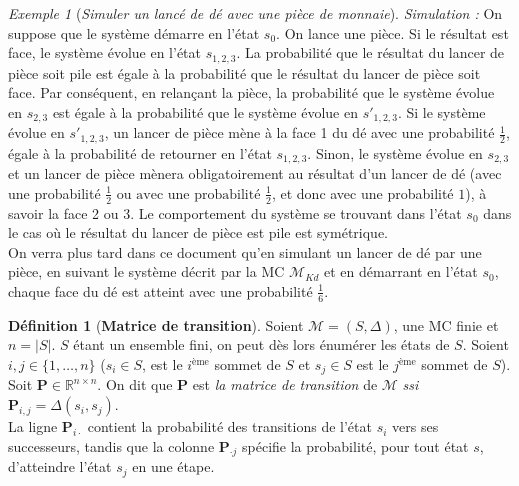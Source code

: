 \documentclass[12pt,a4paper]{report}
\theoremstyle{definition}%
\newtheorem{definition}{Définition}[chapter]
\theoremstyle{remark}
\newtheorem{example}{Exemple}[chapter]
\newcommand{\ssi}{\textit{ssi} }
\begin{document}
\begin{example} [\textit{Simuler un lancé de dé avec une pièce de monnaie}]
	\textit{Simulation : }On suppose que le système démarre en l'état $s_0$. On lance une pièce. Si le résultat est face, le système évolue en l'état $s_{1, 2, 3}$. La probabilité que le résultat du lancer de pièce soit pile est égale à la probabilité que le résultat du lancer de pièce soit face. Par conséquent, en relançant la pièce, la probabilité que le système évolue en $s_{2, 3}$ est égale à la probabilité que le système évolue en $s'_{1, 2, 3}$. Si le système évolue en $s'_{1, 2, 3}$, un lancer de pièce mène à la face 1 du dé avec une probabilité $\frac{1}{2}$, égale à la probabilité de retourner en l'état $s_{1, 2, 3}$. Sinon, le système évolue en $s_{2, 3}$ et un lancer de pièce mènera obligatoirement au résultat d'un lancer de dé (avec une probabilité $\frac{1}{2} \text{ ou avec une probabilité }  \frac{1}{2}$, et donc avec une probabilité $1$), à savoir la face 2 ou 3. Le comportement du système se trouvant dans l'état $s_0$ dans le cas où le résultat du lancer de pièce est pile est symétrique.\\
	
	On verra plus tard dans ce document qu'en simulant un lancer de dé par une pièce, en suivant le système décrit par la MC $\mathcal{M}_{Kd}$ et en démarrant en l'état $s_0$, chaque face du dé est atteint avec une probabilité $\frac{1}{6}$.
\end{example}

\begin{definition}[\textbf{Matrice de transition}]
	Soient $\mathcal{M} = (S, \Delta)$, une MC finie et $n = |S|$. $S$ étant un ensemble fini, on peut dès lors énumérer les états de $S$. Soient $i,j \in \{1, \dots, n\}$ ($s_i \in S$, est le $i^{\text{ème}}$ sommet de $S$ et $s_j \in S$ est le $j^{\text{ème}}$ sommet de $S$). Soit \textbf{P}$\in \mathbb{R}^{n \times n}$. On dit que
	\textbf{P} est \textit{la matrice de transition} de $\mathcal{M}$ \ssi $\textbf{P}_{i,j} = \Delta(s_i, s_j)$.\\
	La ligne $\textbf{P}_{i \cdot}$ contient la probabilité des transitions de l'état $s_i$ vers ses successeurs, tandis que la colonne $\textbf{P}_{\cdot j}$ spécifie la probabilité, pour tout état $s$, d'atteindre l'état $s_j$ en une étape.
\end{definition}
\end{document}
